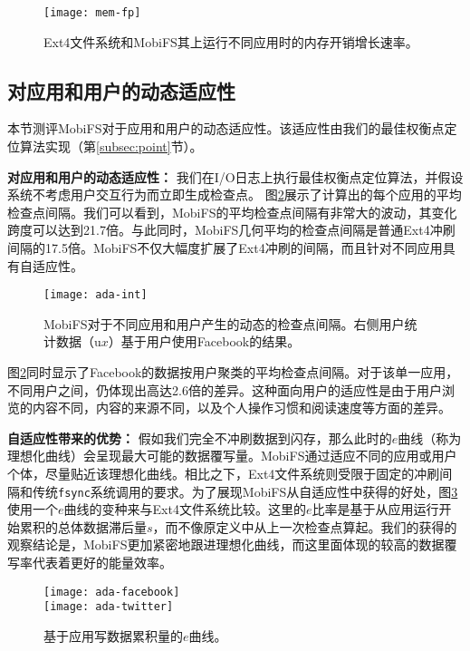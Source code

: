 \begin{figure}[!ht]
  \centering
  \texttt{[image: mem-fp]}
  \caption{Ext4文件系统和MobiFS其上运行不同应用时的内存开销增长速率。}
  \label{fig:mem-fp}
\end{figure}

\subsection{对应用和用户的动态适应性} \label{subsec:eval-ada}

本节测评MobiFS对于应用和用户的动态适应性。该适应性由我们的最佳权衡点定位算法实现（第\ref{subsec:point}节）。

\noindent\textbf{对应用和用户的动态适应性：}
我们在I/O日志上执行最佳权衡点定位算法，并假设系统不考虑用户交互行为而立即生成检查点。
图\ref{fig:ada-int}展示了计算出的每个应用的平均检查点间隔。我们可以看到，MobiFS的平均检查点间隔有非常大的波动，其变化跨度可以达到21.7倍。与此同时，MobiFS几何平均的检查点间隔是普通Ext4冲刷间隔的17.5倍。MobiFS不仅大幅度扩展了Ext4冲刷的间隔，而且针对不同应用具有自适应性。

\begin{figure}[!ht]
  \centering
  \texttt{[image: ada-int]}
  \caption{MobiFS对于不同应用和用户产生的动态的检查点间隔。右侧用户统计数据（u$x$）基于用户使用Facebook的结果。}
  \label{fig:ada-int}
\end{figure}

图\ref{fig:ada-int}同时显示了Facebook的数据按用户聚类的平均检查点间隔。对于该单一应用，不同用户之间，仍体现出高达2.6倍的差异。这种面向用户的适应性是由于用户浏览的内容不同，内容的来源不同，以及个人操作习惯和阅读速度等方面的差异。

\noindent\textbf{自适应性带来的优势：}
假如我们完全不冲刷数据到闪存，那么此时的$e$曲线（称为理想化曲线）会呈现最大可能的数据覆写量。MobiFS通过适应不同的应用或用户个体，尽量贴近该理想化曲线。相比之下，Ext4文件系统则受限于固定的冲刷间隔和传统\texttt{fsync}系统调用的要求。为了展现MobiFS从自适应性中获得的好处，图\ref{fig:spa-ada}使用一个$e$曲线的变种来与Ext4文件系统比较。这里的$e$比率是基于从应用运行开始累积的总体数据滞后量$s$，而不像原定义中从上一次检查点算起。我们的获得的观察结论是，MobiFS更加紧密地跟进理想化曲线，而这里面体现的较高的数据覆写率代表着更好的能量效率。

\begin{figure}[!ht]
\centering
\texttt{[image: ada-facebook]}\\
\texttt{[image: ada-twitter]}\\
\caption{基于应用写数据累积量的$e$曲线。}
\label{fig:spa-ada}
\end{figure}

